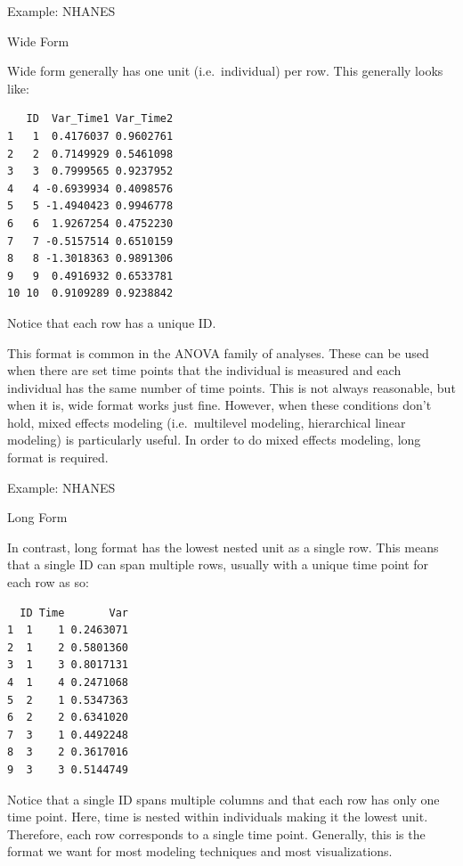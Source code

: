 \documentclass[ignorenonframetext,]{beamer}
\begin{document}
\begin{frame}[fragile]{Example: NHANES}

\begin{block}{Wide Form}

Wide form generally has one unit (i.e.~individual) per row. This
generally looks like:

\begin{verbatim}
   ID  Var_Time1 Var_Time2
1   1  0.4176037 0.9602761
2   2  0.7149929 0.5461098
3   3  0.7999565 0.9237952
4   4 -0.6939934 0.4098576
5   5 -1.4940423 0.9946778
6   6  1.9267254 0.4752230
7   7 -0.5157514 0.6510159
8   8 -1.3018363 0.9891306
9   9  0.4916932 0.6533781
10 10  0.9109289 0.9238842
\end{verbatim}

Notice that each row has a unique ID.

This format is common in the ANOVA family of analyses. These can be used
when there are set time points that the individual is measured and each
individual has the same number of time points. This is not always
reasonable, but when it is, wide format works just fine. However, when
these conditions don't hold, mixed effects modeling (i.e.~multilevel
modeling, hierarchical linear modeling) is particularly useful. In order
to do mixed effects modeling, long format is required.

\end{block}

\end{frame}

\begin{frame}[fragile]{Example: NHANES}

\begin{block}{Long Form}

In contrast, long format has the lowest nested unit as a single row.
This means that a single ID can span multiple rows, usually with a
unique time point for each row as so:

\begin{verbatim}
  ID Time       Var
1  1    1 0.2463071
2  1    2 0.5801360
3  1    3 0.8017131
4  1    4 0.2471068
5  2    1 0.5347363
6  2    2 0.6341020
7  3    1 0.4492248
8  3    2 0.3617016
9  3    3 0.5144749
\end{verbatim}

Notice that a single ID spans multiple columns and that each row has
only one time point. Here, time is nested within individuals making it
the lowest unit. Therefore, each row corresponds to a single time point.
Generally, this is the format we want for most modeling techniques and
most visualizations.

\end{block}

\end{frame}
\end{document}
